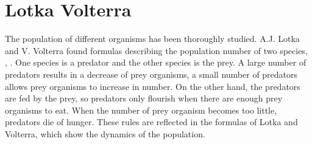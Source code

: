 \documentclass[11pt]{article}
\begin{document}
\section{Lotka Volterra}
The population of different organisms has been thoroughly studied. A.J. Lotka and V. Volterra found formulas describing the population number of two species, \cite{lotka}, \cite{volterra}. One species is a predator and the other species is the prey. A large number of predators results in a decrease of prey organisms, a small number of predators allows prey organisms to increase in number. On the other hand, the predators are fed by the prey, so predators only flourish when there are enough prey organisms to eat. When the number of prey organism becomes too little, predators die of hunger. These rules are reflected in the formulas of Lotka and Volterra, \cite{lotkaVolterra} which show the dynamics of the population.\\
\end{document}
